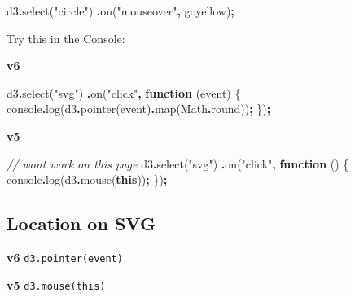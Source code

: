 \documentclass[
  openany]{book}
\newenvironment{Shaded}{\begin{snugshade}}{\end{snugshade}}
\newcommand{\BuiltInTok}[1]{#1}
\newcommand{\CommentTok}[1]{\textcolor[rgb]{0.56,0.35,0.01}{\textit{#1}}}
\newcommand{\FunctionTok}[1]{\textcolor[rgb]{0.00,0.00,0.00}{#1}}
\newcommand{\KeywordTok}[1]{\textcolor[rgb]{0.13,0.29,0.53}{\textbf{#1}}}
\newcommand{\NormalTok}[1]{#1}
\newcommand{\OperatorTok}[1]{\textcolor[rgb]{0.81,0.36,0.00}{\textbf{#1}}}
\newcommand{\StringTok}[1]{\textcolor[rgb]{0.31,0.60,0.02}{#1}}
\begin{document}
\begin{Shaded}
\begin{Highlighting}[]
\NormalTok{d3}\OperatorTok{.}\FunctionTok{select}\NormalTok{(}\StringTok{"circle"}\NormalTok{)}
  \OperatorTok{.}\FunctionTok{on}\NormalTok{(}\StringTok{"mouseover"}\OperatorTok{,}\NormalTok{ goyellow)}\OperatorTok{;}
\end{Highlighting}
\end{Shaded}

Try this in the Console:

\textbf{v6}

\begin{Shaded}
\begin{Highlighting}[]
\NormalTok{d3}\OperatorTok{.}\FunctionTok{select}\NormalTok{(}\StringTok{"svg"}\NormalTok{)}
  \OperatorTok{.}\FunctionTok{on}\NormalTok{(}\StringTok{"click"}\OperatorTok{,} \KeywordTok{function}\NormalTok{ (}\BuiltInTok{event}\NormalTok{) \{}
    \BuiltInTok{console}\OperatorTok{.}\FunctionTok{log}\NormalTok{(d3}\OperatorTok{.}\FunctionTok{pointer}\NormalTok{(}\BuiltInTok{event}\NormalTok{)}\OperatorTok{.}\FunctionTok{map}\NormalTok{(}\BuiltInTok{Math}\OperatorTok{.}\FunctionTok{round}\NormalTok{))}\OperatorTok{;}
\NormalTok{    \})}\OperatorTok{;}
\end{Highlighting}
\end{Shaded}

\textbf{v5}

\begin{Shaded}
\begin{Highlighting}[]
\CommentTok{// won\textquotesingle{}t work on this page}
\NormalTok{d3}\OperatorTok{.}\FunctionTok{select}\NormalTok{(}\StringTok{"svg"}\NormalTok{)}
  \OperatorTok{.}\FunctionTok{on}\NormalTok{(}\StringTok{"click"}\OperatorTok{,} \KeywordTok{function}\NormalTok{ () \{}
    \BuiltInTok{console}\OperatorTok{.}\FunctionTok{log}\NormalTok{(d3}\OperatorTok{.}\FunctionTok{mouse}\NormalTok{(}\KeywordTok{this}\NormalTok{))}\OperatorTok{;}
\NormalTok{    \})}\OperatorTok{;}
\end{Highlighting}
\end{Shaded}

\hypertarget{location-on-svg}{%
\subsection{Location on SVG}\label{location-on-svg}}

\textbf{v6}
\texttt{d3.pointer(event)}

\textbf{v5}
\texttt{d3.mouse(this)}
\end{document}
